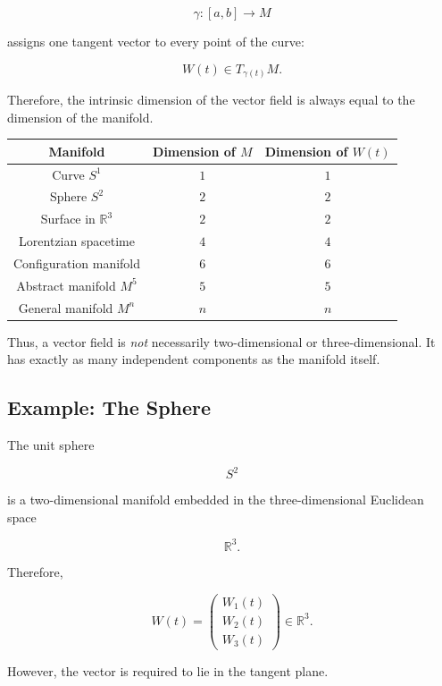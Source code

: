 \documentclass[12pt,a4paper]{article}
\theoremstyle{notespace}
\begin{document}
\[
\gamma:[a,b]\rightarrow M
\]

assigns one tangent vector to every point of the curve:

\[
\boxed{
	W(t)\in T_{\gamma(t)}M.
}
\]

Therefore, the intrinsic dimension of the vector field is always equal to
the dimension of the manifold.

\bigskip

\begin{center}
	\begin{tabular}{|c|c|c|}
		\hline
		Manifold & Dimension of \(M\) & Dimension of \(W(t)\)\\
		\hline
		Curve \(S^1\) & \(1\) & \(1\)\\
		Sphere \(S^2\) & \(2\) & \(2\)\\
		Surface in \(\mathbb{R}^3\) & \(2\) & \(2\)\\
		Lorentzian spacetime & \(4\) & \(4\)\\
		Configuration manifold & \(6\) & \(6\)\\
		Abstract manifold \(M^5\) & \(5\) & \(5\)\\
		General manifold \(M^n\) & \(n\) & \(n\)\\
		\hline
	\end{tabular}
\end{center}

Thus, a vector field is \emph{not} necessarily two-dimensional or
three-dimensional. It has exactly as many independent components as the
manifold itself.


\subsection{Example: The Sphere}

The unit sphere

\[
S^2
\]

is a two-dimensional manifold embedded in the three-dimensional Euclidean
space

\[
\mathbb{R}^3.
\]

Therefore,

\[
W(t)
=
\begin{pmatrix}
	W_1(t)\\
	W_2(t)\\
	W_3(t)
\end{pmatrix}
\in\mathbb{R}^3.
\]

However, the vector is required to lie in the tangent plane.
\end{document}
